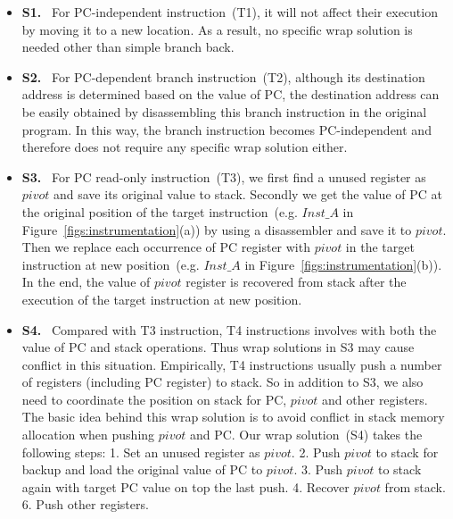 \begin{itemize}

\item \textbf{S1. }~For PC-independent instruction~(T1), it will not affect their execution by moving it to a new location. As a result, no specific wrap solution is needed other than simple branch back.

\item \textbf{S2. }~For PC-dependent branch instruction~(T2), although its destination address is determined based on the value of PC, the destination address can be easily obtained by disassembling this branch instruction in the original program. In this way, the branch instruction becomes PC-independent and therefore does not require any specific wrap solution either.

\item \textbf{S3. }~For PC read-only instruction~(T3), we first find a unused register as $pivot$ and save its original value to stack. Secondly we get the value of PC at the original position of the target instruction~(e.g. $Inst\_A$ in Figure~\ref{figs:instrumentation}(a)) by using a disassembler and save it to $pivot$. Then we replace each occurrence of PC register with $pivot$ in the target instruction at new position~(e.g. $Inst\_A$ in Figure~\ref{figs:instrumentation}(b)). In the end, the value of $pivot$ register is recovered from stack after the execution of the target instruction at new position.

\item \textbf{S4. }~Compared with T3 instruction, T4 instructions involves with both the value of PC and stack operations. Thus wrap solutions in S3 may cause conflict in this situation. Empirically, T4 instructions usually push a number of registers (including PC register) to stack. So in addition to S3, we also need to coordinate the position on stack for PC, $pivot$ and other registers. The basic idea behind this wrap solution is to avoid conflict in stack memory allocation when pushing $pivot$ and PC. Our wrap solution~(S4) takes the following steps: 1. Set an unused register as $pivot$. 2. Push $pivot$ to stack for backup and load the original value of PC to $pivot$. 3. Push $pivot$ to stack again with target PC value on top the last push. 4. Recover $pivot$ from stack. 6. Push other registers. 


\end{itemize}

